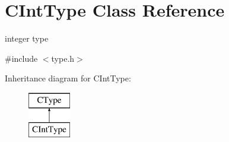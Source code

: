 \hypertarget{classCIntType}{\section{C\-Int\-Type Class Reference}
\label{classCIntType}
}


integer type  




{\ttfamily \#include $<$type.\-h$>$}

Inheritance diagram for C\-Int\-Type\-:\begin{figure}[H]
\begin{center}
\leavevmode
\includegraphics[height=2.000000cm]{classCIntType}
\end{center}
\end{figure}
